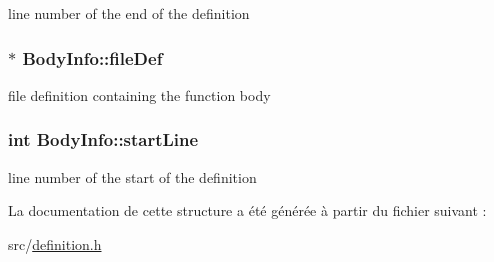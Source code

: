 line number of the end of the definition 

\hypertarget{struct_body_info_a0a09e75f0c6dbd45673103dccc125172}{}
\subsubsection[{file\+Def}]{$\ast$ Body\+Info\+::file\+Def}\label{struct_body_info_a0a09e75f0c6dbd45673103dccc125172}


file definition containing the function body 

\hypertarget{struct_body_info_a13ecf2183dee65bdf06cda72cd0363a0}{}
\subsubsection[{start\+Line}]{\setlength{\rightskip}{0pt plus 5cm}int Body\+Info\+::start\+Line}\label{struct_body_info_a13ecf2183dee65bdf06cda72cd0363a0}


line number of the start of the definition 



La documentation de cette structure a été générée à partir du fichier suivant \+:\begin{DoxyCompactItemize}
\item 
src/\hyperlink{definition_8h}{definition.\+h}\end{DoxyCompactItemize}
